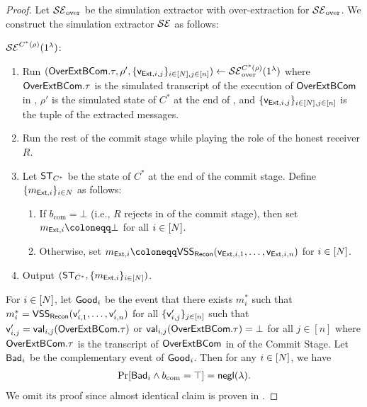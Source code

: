 \begin{proof}
Let $\mathcal{SE}_{\mathrm{over}}$ be the simulation extractor with over-extraction for $\mathcal{SE}_{\mathrm{over}}$. We construct the simulation extractor $\mathcal{SE}$ as follows: 

\smallskip
\noindent
$\mathcal{SE}^{C^*(\rho)}(1^\lambda)$: 
\begin{enumerate}
\item Run 
$(\mathsf{OverExtBCom}.\tau,\rho',\{\mathsf{v}_{\mathsf{Ext},i,j}\}_{i\in[N],j\in[n]})\gets \mathcal{SE}_{\mathrm{over}}^{C^*(\rho)}(1^\lambda)$
where $\mathsf{OverExtBCom}.\tau$ is the simulated transcript of the execution of $\mathsf{OverExtBCom}$ in , $\rho'$ is the simulated state of $C^*$ at the end of  , and $\{\mathsf{v}_{\mathsf{Ext},i,j}\}_{i\in[N],j\in[n]}$ is the tuple of the extracted messages. 
\item Run the rest of the commit stage while playing the role of the honest receiver $R$. 
\item Let $\mathsf{ST}_{C^*}$ be the state of $C^*$ at the end of the commit stage. Define $\{m_{\mathsf{Ext},i}\}_{i\in N}$ as follows:
\begin{enumerate}
\item If $b_{\mathrm{com}}=\bot$ (i.e., $R$ rejects in  of the commit stage), then set $m_{\ext,i}\coloneqq \bot$ for all $i\in [N]$.
\item Otherwise, 
set $m_{\ext,i} \coloneqq \VSS_\Recon(\view_{\ext,i,1}, \ldots, \view_{\ext,i,n})$ for $i\in[N]$. 
\end{enumerate}
\item Output $(\mathsf{ST}_{C^*},\{m_{\mathsf{Ext},i}\}_{i\in [N]})$. 
\end{enumerate}

For $i\in [N]$, let $\mathsf{Good}_i$ be the event that there exists $m^*_i$ such that  $m^*_{i} =\mathsf{VSS}_\mathsf{Recon}(\mathsf{v}'_{i,1}, \ldots, \mathsf{v}'_{i,n})$
for all $\{\mathsf{v}'_{i,j}\}_{j\in[n]}$ such that $\mathsf{v}'_{i,j}=\mathsf{val}_{i,j}(\mathsf{OverExtBCom}.\tau)$ or $\mathsf{val}_{i,j}(\mathsf{OverExtBCom}.\tau)=\bot$ for all $j\in[n]$ where $\mathsf{OverExtBCom}.\tau$ is the transcript of $\mathsf{OverExtBCom}$ in  
of the Commit Stage.  Let $\mathsf{Bad}_i$ be the complementary event of $\mathsf{Good}_i$. 
Then for any $i\in [N]$, we have 
\begin{align}\label{eq:Bad_and_acc}
    \Pr[\mathsf{Bad}_i\land b_{\mathrm{com}}=\top]=\mathsf{negl}(\lambda). 
\end{align}
We omit its proof since almost identical claim is proven in \cite[Section 5.2]{C:CCLY22}. 


\end{proof}
